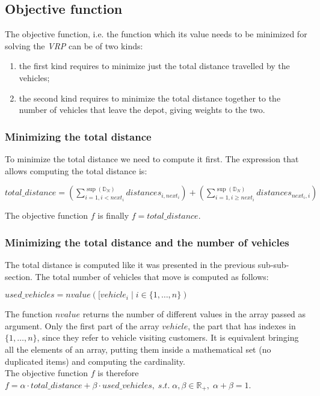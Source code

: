 \documentclass[../main.tex]{subfiles}
\begin{document}
\subsection{Objective function}
The objective function, i.e. the function which its value needs to be minimized for solving the \textit{VRP} can be of two kinds:
\begin{enumerate}
    \item the first kind requires to minimize just the total distance travelled by the vehicles;
    \item the second kind requires to minimize the total distance together to the number of vehicles that leave the depot, giving weights to the two.
\end{enumerate}
\subsubsection{Minimizing the total distance}
To minimize the total distance we need to compute it first. The expression that allows computing the total distance is:
\begin{center} %
    \begin{math}
        total\_distance = (\sum_{i = 1, i < next_i}^{\sup{}(\mathbb{D}_N)}{distances_{i, next_i}}) + (\sum_{i = 1, i \geq next_i}^{\sup{}(\mathbb{D}_N)}{distances_{next_i, i}})
    \end{math}
\end{center}
The objective function $f$ is finally $f = total\_distance$.

\subsubsection{Minimizing the total distance and the number of vehicles}
The total distance is computed like it was presented in the previous sub-sub-section. The total number of vehicles that move is computed as follows:
\begin{center} %
    \begin{math}
        used\_vehicles = nvalue([vehicle_i \; | \; i \in \{1,\dots,n\})
    \end{math}
\end{center}
The function $nvalue$ returns the number of different values in the array passed as argument.
Only the first part of the array $vehicle$, the part that has indexes in $\{1,\dots,n\}$, since they refer to vehicle visiting customers.
It is equivalent bringing all the elements of an array, putting them inside a mathematical set (no duplicated items) and computing the cardinality.\\
The objective function $f$ is therefore $f = \alpha{} \cdot total\_distance + \beta{} \cdot used\_vehicles, \; s.t. \; \alpha{}, \beta{} \in \mathbb{R}_+, \; \alpha{} + \beta{} = 1$.
\end{document}
